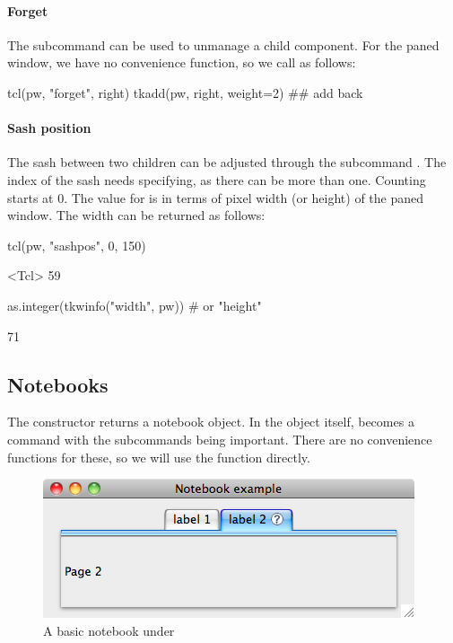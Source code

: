 \paragraph{Forget}
The subcommand  can be used to
unmanage a child component. For the paned window, we have no convenience function, so we call as follows:
\begin{Schunk}
\begin{Sinput}
 tcl(pw, "forget", right)
 tkadd(pw, right, weight=2) ## add back
\end{Sinput}
\end{Schunk}

\paragraph{Sash position}
The sash between two children can be adjusted through the subcommand
. The index of the sash needs
specifying, as there can be more than one. Counting starts at 0. The
value for  is in terms of pixel width (or height) of the
paned window. The width can be returned as follows:
\begin{Schunk}
\begin{Sinput}
 tcl(pw, "sashpos", 0, 150)
\end{Sinput}
\begin{Soutput}
<Tcl> 59 
\end{Soutput}
\begin{Sinput}
 as.integer(tkwinfo("width", pw))  # or "height"
\end{Sinput}
\begin{Soutput}
[1] 71
\end{Soutput}
\end{Schunk}

\subsection{Notebooks}
\label{sec:tcltk:notebooks}

The  constructor returns a notebook
object. In \TK\/ the object itself, becomes a command with the
subcommands being important. There are no convenience functions for
these, so we will use the  function directly.

\begin{figure}
  \centering
  \includegraphics[width=.6\textwidth]{fig-tcltk-notebook}
 \caption{A basic notebook under \OSX{}}
  \label{fig:fig-notebook-example}
\end{figure}


